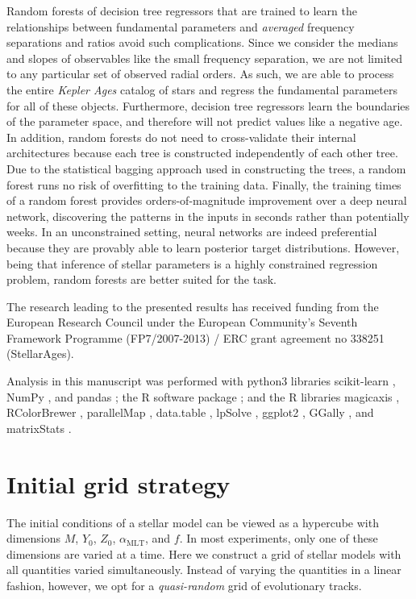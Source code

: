 \documentclass[manuscript]{aastex}
\begin{document}
Random forests of decision tree regressors that are trained to learn the relationships between fundamental parameters and \emph{averaged} frequency separations and ratios avoid such complications. Since we consider the medians and slopes of observables like the small frequency separation, we are not limited to any particular set of observed radial orders. As such, we are able to process the entire \emph{Kepler Ages} catalog of stars and regress the fundamental parameters for all of these objects. Furthermore, decision tree regressors learn the boundaries of the parameter space, and therefore will not predict values like a negative age. In addition, random forests do not need to cross-validate their internal architectures because each tree is constructed independently of each other tree. Due to the statistical bagging approach used in constructing the trees, a random forest runs no risk of overfitting to the training data. Finally, the training times of a random forest provides orders-of-magnitude improvement over a deep neural network, discovering the patterns in the inputs in seconds rather than potentially weeks. In an unconstrained setting, neural networks are indeed preferential because they are provably able to learn posterior target distributions. However, being that inference of stellar parameters is a highly constrained regression problem, random forests are better suited for the task. 

\acknowledgments The research leading to the presented results has received funding from the European Research Council under the European Community's Seventh Framework Programme (FP7/2007-2013) / ERC grant agreement no 338251 (StellarAges). 

Analysis in this manuscript was performed with python3 libraries scikit-learn \citep{scikit-learn}, NumPy \citep{van2011numpy}, and pandas \citep{mckinney2010data}; the R software package \citep{R}; and the R libraries magicaxis \citep{magicaxis}, RColorBrewer \citep{RColorBrewer}, parallelMap \citep{parallelMap}, data.table \citep{data.table}, lpSolve \citep{lpSolve}, ggplot2 \citep{ggplot2}, GGally \citep{GGally}, and matrixStats \citep{matrixStats}. 

\appendix

\section{Initial grid strategy}
\label{sec:grid}
The initial conditions of a stellar model can be viewed as a hypercube with dimensions $M$, $Y_0$, $Z_0$, $\alpha_{\text{MLT}}$, and $f$. In most experiments, only one of these dimensions are varied at a time. Here we construct a grid of stellar models with all quantities varied simultaneously. Instead of varying the quantities in a linear fashion, however, we opt for a \emph{quasi-random} grid of evolutionary tracks. 
\end{document}
